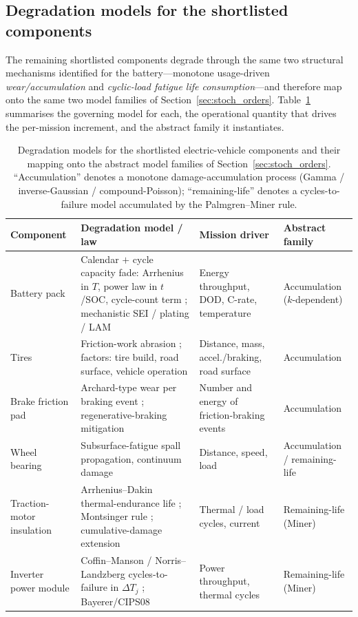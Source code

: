 \documentclass[11pt,a4paper]{article}
\theoremstyle{plain}
\theoremstyle{definition}
\theoremstyle{remark}
\begin{document}
\subsection{Degradation models for the shortlisted components}
\label{sec:ev_deg_models}

The remaining shortlisted components degrade through the same two structural mechanisms identified for the battery---monotone usage-driven \emph{wear/accumulation} and \emph{cyclic-load fatigue life consumption}---and therefore map onto the same two model families of Section~\ref{sec:stoch_orders}.
Table~\ref{tab:ev_deg_models} summarises the governing model for each, the operational quantity that drives the per-mission increment, and the abstract family it instantiates.

\begin{table}[htbp]
\centering
\caption{Degradation models for the shortlisted electric-vehicle components and their mapping onto the abstract model families of Section~\ref{sec:stoch_orders}.
``Accumulation'' denotes a monotone damage-accumulation process (Gamma / inverse-Gaussian / compound-Poisson); ``remaining-life'' denotes a cycles-to-failure model accumulated by the Palmgren--Miner rule.}
\label{tab:ev_deg_models}
\small
\begin{tabular}{@{}p{2.4cm}p{4.9cm}p{3.0cm}p{2.6cm}@{}}
\toprule
\textbf{Component} & \textbf{Degradation model / law} & \textbf{Mission driver} & \textbf{Abstract family} \\
\midrule
Battery pack
  & Calendar $+$ cycle capacity fade: Arrhenius in $T$, power law in $t$/SOC, cycle-count term \cite[Eqs.~1--3]{Hosen2021}; mechanistic SEI / plating / LAM \cite[Sec.~2.1]{Lv2025}
  & Energy throughput, DOD, C-rate, temperature
  & Accumulation ($k$-dependent) \\[3pt]
Tires
  & Friction-work abrasion \cite[Eq.~7]{SchallamachTurner1960}; factors: tire build, road surface, vehicle operation \cite[Sec.~2.1.2]{Fussell2022}
  & Distance, mass, accel./braking, road surface
  & Accumulation \\[3pt]
Brake friction pad
  & Archard-type wear per braking event \cite[Eqs.~14,~22]{Sha2022}; regenerative-braking mitigation \cite[Sec.~6.1]{Fussell2022}
  & Number and energy of friction-braking events
  & Accumulation \\[3pt]
Wheel bearing
  & Subsurface-fatigue spall propagation, continuum damage \cite[Sec.~2.1.3]{Ohana2023}
  & Distance, speed, load
  & Accumulation / remaining-life \\[3pt]
Traction-motor insulation
  & Arrhenius--Dakin thermal-endurance life \cite{Dakin1948}; Montsinger rule \cite{Montsinger1930}; cumulative-damage extension \cite[Eqs.~1--2]{Zhang2025insul}
  & Thermal / load cycles, current
  & Remaining-life (Miner) \\[3pt]
Inverter power module
  & Coffin--Manson / Norris--Landzberg cycles-to-failure in $\Delta T_j$ \cite[Eqs.~3--5]{Alavi2024}; Bayerer/CIPS08 \cite[Eq.~1]{Bayerer2008}
  & Power throughput, thermal cycles
  & Remaining-life (Miner) \\
\bottomrule
\end{tabular}
\end{table}
\end{document}
